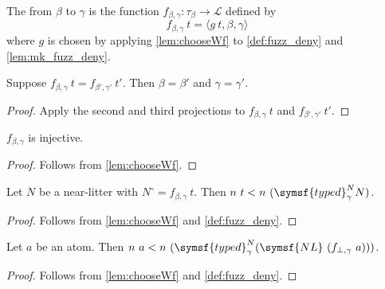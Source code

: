 \begin{definition}
    The  from \( \beta \) to \( \gamma \) is the function \( f_{\beta,\gamma} : \tau_\beta \to \mathcal L \) defined by
    \[ f_{\beta,\gamma}\ t = \langle g\ t, \beta, \gamma \rangle \]
    where \( g \) is chosen by applying \cref{lem:chooseWf} to \cref{def:fuzz_deny} and \cref{lem:mk_fuzz_deny}.
\end{definition}
\begin{lemma}
    \label{lem:fuzz_congr}
    Suppose \( f_{\beta,\gamma}\ t = f_{\beta',\gamma'}\ t' \).
    Then \( \beta = \beta' \) and \( \gamma = \gamma' \).
\end{lemma}
\begin{proof}
    Apply the second and third projections to \( f_{\beta,\gamma}\ t \) and \( f_{\beta',\gamma'}\ t' \).
\end{proof}
\begin{lemma}
    \( f_{\beta,\gamma} \) is injective.
\end{lemma}
\begin{proof}
    Follows from \cref{lem:chooseWf}.
\end{proof}
\begin{lemma}
    Let \( N \) be a near-litter with \( N^\circ = f_{\beta,\gamma}\ t \).
    Then \( n\ t < n\ (\symsf{typed}^N_\gamma N) \).
\end{lemma}
\begin{proof}
    Follows from \cref{lem:chooseWf} and \cref{def:fuzz_deny}.
\end{proof}
\begin{lemma}
    Let \( a \) be an atom.
    Then \( n\ a < n\ (\symsf{typed}^N_\gamma (\symsf{NL}\ (f_{\bot,\gamma}\ a))) \).
\end{lemma}
\begin{proof}
    Follows from \cref{lem:chooseWf} and \cref{def:fuzz_deny}.
\end{proof}
